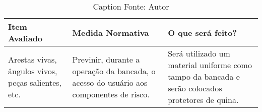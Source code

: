  \begin{table}[!ht]
            \begin{center}
              \begin{tabular}{|p{5cm}|p{5cm}|p{5cm}|}
                \hline
                \textbf{Item Avaliado} & \textbf{Medida Normativa} & \textbf{O que será feito?}
                \\ \hline
                Arestas vivas, ângulos vivos, peças salientes, etc. & Previnir, durante a operação da bancada, o acesso do usuário aos componentes de risco. & Será utilizado um material uniforme como tampo da bancada e serão colocados protetores de quina.
                \\ \hline
              \end{tabular}
              \caption[Caption]{Caption
              \protect Fonte: Autor}
            \label{tabela3}
        \end{center}
    \end{table}